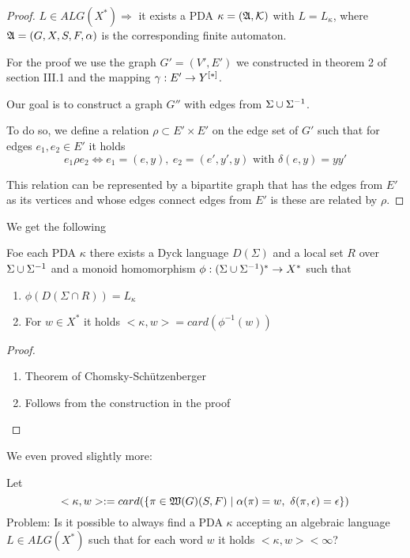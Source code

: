 \begin{proof}
$L\in ALG(X^*) \Rightarrow$ it exists a PDA $\kappa=(\mbox{$\mathfrak{A}$},\mbox{$\mathcal{K}$})$ with
$L = L_\kappa$, where $\mbox{$\mathfrak{A}$}=(G, X, S, F, \alpha)$ is the corresponding finite
automaton.

For the proof we use the graph $G'=(V',E')$ we constructed in theorem 2 of
section III.1 and the mapping $\gamma: E' \to \mbox{${Y}^{[*]}$}$.

Our goal is to construct a graph $G''$ with edges from $\Sigma \cup {\Sigma}^{-1}$.

To do so, we define a relation $\rho \subset E'\times E'$ on the edge set of
$G'$ such that for edges $e_1, e_2\in E'$ it holds
\[ e_1 \rho e_2 \iff e_1 = (e, y),\ e_2 = (e', y', y)\text{ with }\delta(e, y) =
yy' \]

This relation can be represented by a bipartite graph that has the edges from
$E'$ as its vertices and whose edges connect edges from $E'$ is these are
related by $\rho$.

\end{proof}

We get the following
\begin{corollary}
Foe each PDA $\kappa$ there exists a Dyck language $D(\Sigma)$ and a local set
$R$ over $\Sigma \cup {\Sigma}^{-1}$ and a monoid homomorphism $\phi:
(\Sigma \cup {\Sigma}^{-1})^* \to X^*$ such that
\begin{enumerate}
  \item $\phi(D(\Sigma\cap R)) = L_\kappa$
  \item For $w\in X^*$ it holds $<\kappa, w> = card(\phi^{-1}(w))$
\end{enumerate}
\end{corollary}

\begin{proof}
\begin{enumerate}
  \item Theorem of Chomsky-Schützenberger
  \item Follows from the construction in the proof
\end{enumerate}
\end{proof}

We even proved slightly more:

Let \[ <\kappa, w> := card(\mbox{$\{\pi\in\mbox{$\mathfrak{W}(G)$}(S,F)\mid
\alpha(\pi)=w,\ \delta(\pi,\epsilon)=\epsilon\}$})
\]
Problem: Is it possible to always find a PDA $\kappa$ accepting an algebraic
language $L \in ALG(X^*)$ such that for each word $w$ it holds $<\kappa, w> <
\infty$?

